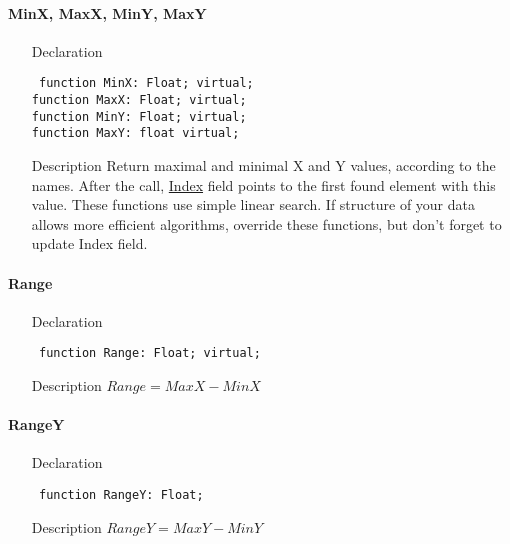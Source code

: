 \documentclass[12pt,a4paper,oneside]{report}
\newcommand{\declarationitem}[1]{{\addfontfeatures{FakeBold=1.3} #1}}
\newcommand{\descriptiontitle}[1]{{\addfontfeatures{FakeSlant}#1}}
\newcommand{\code}[1]{\texttt{#1}}
\begin{document}
\paragraph{MinX, MaxX, MinY, MaxY}
\label{lmPointsVec.TPoints-MinX}
\begin{itemize}
	\item[\declarationitem{Declaration}\hfill]
	\begin{flushleft}
		\code{
			function MinX: Float; virtual;\\
			function MaxX: Float; virtual;\\
			function MinY: Float; virtual;\\
			function MaxY: float virtual;}
	\end{flushleft}
	\item[\descriptiontitle{Description}]
	Return maximal and minimal X and Y values, according to the names. After the call, \hyperref[lmPointsVec.TPoints-Index]{Index} field points to the first found element with this value. These functions use simple linear search. If structure of your data allows more efficient algorithms, override these functions, but don't forget to update Index field. 
\end{itemize}
\label{lmPointsVec.TPoints-Range}
\paragraph{Range}
\begin{itemize}
\item[\declarationitem{Declaration}\hfill]
\begin{flushleft}
	\code{
		function Range: Float; virtual;}
\end{flushleft}
\item[\descriptiontitle{Description}]
$Range=MaxX-MinX$\label{lmPointsVec.TPoints-RangeY}
\end{itemize}
\paragraph{RangeY}
\begin{itemize}
\item[\declarationitem{Declaration}\hfill]
\begin{flushleft}
	\code{
		function RangeY: Float;}
\end{flushleft}
\item[\descriptiontitle{Description}]
$RangeY=MaxY-MinY$
\end{itemize}
\end{document}
